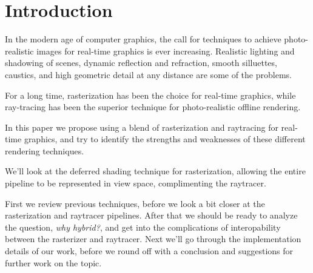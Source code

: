 
\part{Introduction}

In the modern age of computer graphics, the call for techniques to achieve photo-realistic images for real-time graphics is ever increasing. Realistic lighting and shadowing of scenes, dynamic reflection and refraction, smooth silluettes, caustics, and high geometric detail at any distance are some of the problems.

For a long time, rasterization has been the choice for real-time graphics, while ray-tracing has been the superior technique for photo-realistic offline rendering.

In this paper we propose using a blend of rasterization and raytracing for real-time graphics, and try to identify the strengths and weaknesses of these different rendering techniques.

We'll look at the deferred shading technique for rasterization, allowing the entire pipeline to be represented in view space, complimenting the raytracer.

First we review previous techniques, before we look a bit closer at the rasterization and raytracer pipelines. After that we should be ready to analyze the question, \emph{why hybrid?}, and get into the complications of interopability between the rasterizer and raytracer. Next we'll go through the implementation details of our work, before we round off with a conclusion and suggestions for further work on the topic.